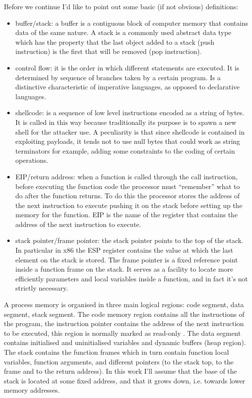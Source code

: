 \documentclass[Lau,binding=0.6cm]{sapthesis}
\begin{document}
Before we continue I’d like to point out some basic (if not obvious) definitions:
\begin{itemize}
\item
buffer/stack: a buffer is a contiguous block of computer memory that contains data of the same nature. A stack is a commonly used abstract data type which has the property that the last object added to a stack (push instruction) is the first that will be removed (pop instruction).
\item
control flow: it is the order in which different statements are executed. It is determined by sequence of branches taken by a certain program. Is a distinctive characteristic of imperative languages, as opposed to declarative languages.
\item
shellcode: is a sequence of low level instructions encoded as a string of bytes. It is called in this way because traditionally its purpose is to spawn a new shell for the attacker use. A peculiarity is that since shellcode is contained in exploiting payloads, it tends not to use null bytes that could work as string terminators for example, adding some constraints to the coding of certain operations. 
\item
EIP/return address: when a function is called through the call instruction, before executing the function code the processor must “remember” what to do after the function returns. To do this the processor stores the address of the next instruction to execute pushing it on the stack before setting up the memory for the function. EIP is the name of the register that contains the address of the next instruction to execute.
\item
stack pointer/frame pointer: the stack pointer points to the top of the stack. In particular in x86 the ESP register contains the value at which the last element on the stack is stored. The frame pointer is a fixed reference point inside a function frame on the stack. It serves as a facility to locate more efficiently parameters and local variables inside a function, and in fact it’s not strictly necessary.
\end{itemize}


A process memory is organised in three main logical regions: code segment, data segment, stack segment.
The code memory region contains all the instructions of the program, the instruction pointer contains the address of the next instruction to be executed, this region is normally marked as read-only . The data segment contains initialised and uninitialised variables and dynamic buffers (heap region). The stack contains the function frames which in turn contain function local variables, function arguments, and different pointers (to the stack top, to the frame and to the return address). In this work I’ll assume that the base of the stack is located at some fixed address, and that it grows down, i.e. towards lower memory addresses.
\end{document}
